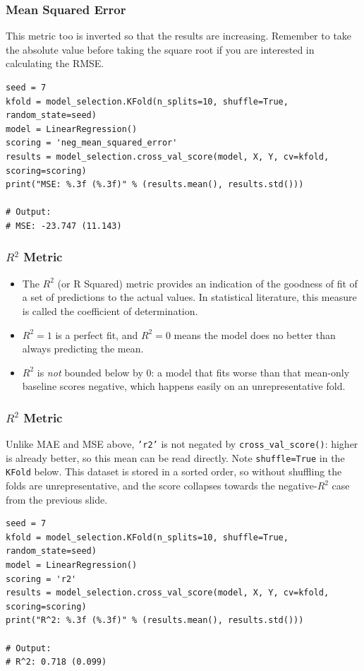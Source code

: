 \begin{frame}[fragile]\frametitle{Mean Squared Error}
This metric too is inverted so that the results are increasing. Remember to take the absolute value before taking the square root if you are interested in calculating the RMSE.
\begin{lstlisting}
seed = 7
kfold = model_selection.KFold(n_splits=10, shuffle=True, random_state=seed)
model = LinearRegression()
scoring = 'neg_mean_squared_error'
results = model_selection.cross_val_score(model, X, Y, cv=kfold, scoring=scoring)
print("MSE: %.3f (%.3f)" % (results.mean(), results.std()))

# Output:
# MSE: -23.747 (11.143)
\end{lstlisting}
\end{frame}


\begin{frame}[fragile]\frametitle{$R^2$ Metric}

	\begin{itemize}
	\item The $R^2$ (or R Squared) metric provides an indication of the goodness of fit of a set of predictions to the actual values. In statistical literature, this measure is called the coefficient of determination.
	\item $R^2 = 1$ is a perfect fit, and $R^2 = 0$ means the model does no better than always predicting the mean.
	\item $R^2$ is \emph{not} bounded below by 0: a model that fits worse than that mean-only baseline scores negative, which happens easily on an unrepresentative fold.
	\end{itemize}

\end{frame}

\begin{frame}[fragile]\frametitle{$R^2$ Metric}
Unlike MAE and MSE above, \texttt{'r2'} is not negated by \texttt{cross\_val\_score()}: higher is
already better, so this mean can be read directly. Note \texttt{shuffle=True} in the \texttt{KFold}
below. This dataset is stored in a sorted order, so without shuffling the folds are unrepresentative,
and the score collapses towards the negative-$R^2$ case from the previous slide.
\begin{lstlisting}
seed = 7
kfold = model_selection.KFold(n_splits=10, shuffle=True, random_state=seed)
model = LinearRegression()
scoring = 'r2'
results = model_selection.cross_val_score(model, X, Y, cv=kfold, scoring=scoring)
print("R^2: %.3f (%.3f)" % (results.mean(), results.std()))

# Output:
# R^2: 0.718 (0.099)
\end{lstlisting}
\end{frame}

